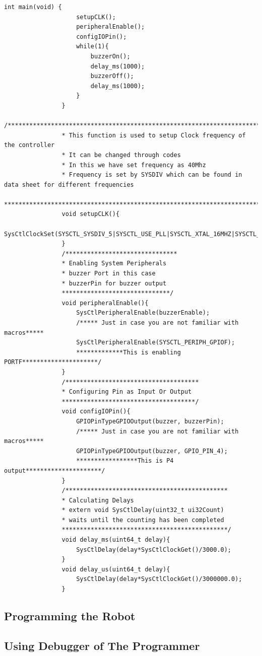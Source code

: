 \documentclass[a4paper,10pt,oneside]{article}
\begin{document}
\begin{lstlisting}[style=CStyle]
				int main(void) {
					setupCLK();
					peripheralEnable();
					configIOPin();
					while(1){
						buzzerOn();
						delay_ms(1000);
						buzzerOff();
						delay_ms(1000);
					}
				}
				/***************************************************************************************
				* This function is used to setup Clock frequency of the controller
				* It can be changed through codes
				* In this we have set frequency as 40Mhz
				* Frequency is set by SYSDIV which can be found in data sheet for different frequencies
				***************************************************************************************/
				void setupCLK(){
					SysCtlClockSet(SYSCTL_SYSDIV_5|SYSCTL_USE_PLL|SYSCTL_XTAL_16MHZ|SYSCTL_OSC_MAIN);
				}
				/*******************************
				* Enabling System Peripherals
				* buzzer Port in this case
				* buzzerPin for buzzer output
				******************************/
				void peripheralEnable(){
					SysCtlPeripheralEnable(buzzerEnable);
					/***** Just in case you are not familiar with macros*****
					SysCtlPeripheralEnable(SYSCTL_PERIPH_GPIOF);
					*************This is enabling PORTF*********************/
				}
				/*************************************
				* Configuring Pin as Input Or Output
				*************************************/
				void configIOPin(){
					GPIOPinTypeGPIOOutput(buzzer, buzzerPin);
					/***** Just in case you are not familiar with macros*****
					GPIOPinTypeGPIOOutput(buzzer, GPIO_PIN_4);
					*****************This is P4 output*********************/
				}
				/*********************************************
				* Calculating Delays
				* extern void SysCtlDelay(uint32_t ui32Count)
				* waits until the counting has been completed
				**********************************************/
				void delay_ms(uint64_t delay){
					SysCtlDelay(delay*SysCtlClockGet()/3000.0);
				}
				void delay_us(uint64_t delay){
					SysCtlDelay(delay*SysCtlClockGet()/3000000.0);
				}
			\end{lstlisting}
			
		\subsection{\huge \textbf{Programming the Robot}}
		\subsection{\huge \textbf{Using Debugger of The Programmer}}
\end{document}
